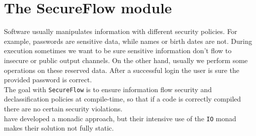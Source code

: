\section{The SecureFlow module}\label{sec:flow}
Software usually manipulates information with different security policies. For example, passwords are sensitive data, while names or birth dates are not. During execution sometimes we want to be sure sensitive information don't flow to insecure or public output channels. On the other hand, usually we perform some operations on these reserved data. After a successful login the user is sure the provided password is correct. \\
The goal with \texttt{SecureFlow} is to ensure information flow security and declassification policies at compile-time, so that if a code is correctly compiled there are no certain security violations. \\
\citeauthor{russo2008library} \cite{russo2008library} have developed a monadic approach, but their intensive use of the \texttt{IO} monad makes their solution not fully static.

